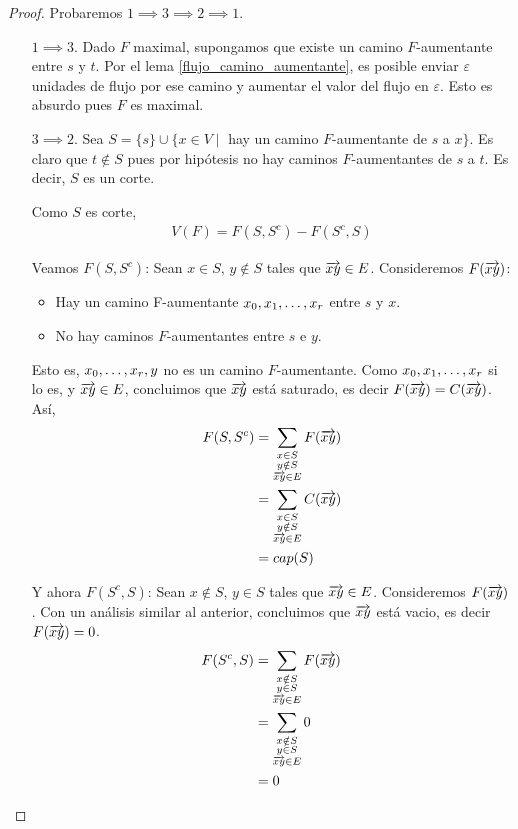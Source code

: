 \begin{proof}
  Probaremos $1 \implies 3 \implies 2 \implies 1$.
  \begin{itemize}
  \item [$1 \implies 3$.]
    Dado $F$ maximal, supongamos que existe un camino $F$-aumentante entre
    $s$ y $t$. Por el lema \ref{flujo_camino_aumentante}, es posible enviar
    $\varepsilon$ unidades de flujo por ese camino y aumentar el valor del
    flujo en $\varepsilon$. Esto es absurdo pues $F$ es maximal.

  \item[$3 \implies 2$.]
    Sea $S = \{s\} \cup \{x \in V \mid$ hay un camino $F$-aumentante de $s$ a $x\}$.
    Es claro que $t \notin S$ pues por hipótesis no hay caminos $F$-aumentantes
    de $s$ a $t$. Es decir, $S$ es un corte.

    Como $S$ es corte,
    \begin{align}
      V(F) = F(S, S^c) - F(S^c, S)
    \end{align}

    Veamos $F(S, S^c)$: Sean $x \in S$, $y \notin S$ tales que $\overrightarrow{xy} \in E$.
    Consideremos $F(\overrightarrow{xy})$:
    \begin{itemize}
    \item Hay un camino F-aumentante $x_0, x_1, \mathellipsis, x_r$ entre $s$ y $x$.
    \item No hay caminos $F$-aumentantes entre $s$ e $y$.
    \end{itemize}

    Esto es, $x_0, \mathellipsis, x_r, y$ no es un camino $F$-aumentante.
    Como $x_0, x_1, \mathellipsis, x_r$ si lo es, y $\overrightarrow{xy} \in E$, concluimos
    que $\overrightarrow{xy}$ está saturado, es decir $F(\overrightarrow{xy}) = C(\overrightarrow{xy})$.
    Así,
    \begin{align}
      F(S, S^c)
      &= \sum_{\substack{x\in S \\ y \notin S \\ \overrightarrow{xy} \in E}} F(\overrightarrow{xy})\\
      &= \sum_{\substack{x\in S\\ y \notin S\\ \overrightarrow{xy} \in E}} C(\overrightarrow{xy})\\
      &= cap(S)
    \end{align}
    
    Y ahora $F(S^c, S)$: Sean $x \notin S$, $y \in S$ tales que $\overrightarrow{xy} \in E$.
    Consideremos $F(\overrightarrow{xy})$. Con un análisis similar al anterior, concluimos
    que $\overrightarrow{xy}$ está vacio, es decir $F(\overrightarrow{xy}) = 0$.
    \begin{align}
      F(S^c, S)
      &= \sum_{\substack{x \notin S \\ y \in S \\ \overrightarrow{xy} \in E}} F(\overrightarrow{xy})\\
      &= \sum_{\substack{x\notin S\\ y \in S\\ \overrightarrow{xy} \in E}} 0\\
      &= 0
    \end{align}
    

\end{itemize}
\end{proof}
